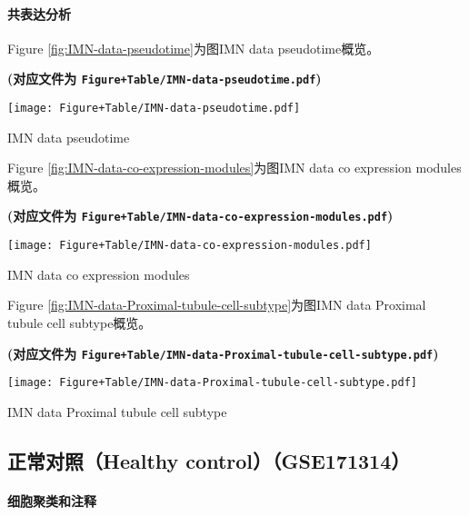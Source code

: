 \documentclass[
]{article}
\begin{document}
\hypertarget{ux5171ux8868ux8fbeux5206ux6790-2}{%
\paragraph{共表达分析}\label{ux5171ux8868ux8fbeux5206ux6790-2}}

Figure \ref{fig:IMN-data-pseudotime}为图IMN data pseudotime概览。

\textbf{(对应文件为 \texttt{Figure+Table/IMN-data-pseudotime.pdf})}

\def\@captype{figure}
\begin{center}
\texttt{[image: Figure+Table/IMN-data-pseudotime.pdf]}
\caption{IMN data pseudotime}\label{fig:IMN-data-pseudotime}
\end{center}

Figure \ref{fig:IMN-data-co-expression-modules}为图IMN data co expression modules概览。

\textbf{(对应文件为 \texttt{Figure+Table/IMN-data-co-expression-modules.pdf})}

\def\@captype{figure}
\begin{center}
\texttt{[image: Figure+Table/IMN-data-co-expression-modules.pdf]}
\caption{IMN data co expression modules}\label{fig:IMN-data-co-expression-modules}
\end{center}

Figure \ref{fig:IMN-data-Proximal-tubule-cell-subtype}为图IMN data Proximal tubule cell subtype概览。

\textbf{(对应文件为 \texttt{Figure+Table/IMN-data-Proximal-tubule-cell-subtype.pdf})}

\def\@captype{figure}
\begin{center}
\texttt{[image: Figure+Table/IMN-data-Proximal-tubule-cell-subtype.pdf]}
\caption{IMN data Proximal tubule cell subtype}\label{fig:IMN-data-Proximal-tubule-cell-subtype}
\end{center}

\hypertarget{ux6b63ux5e38ux5bf9ux7167healthy-controlgse171314}{%
\subsection{正常对照（Healthy control）（GSE171314）}\label{ux6b63ux5e38ux5bf9ux7167healthy-controlgse171314}}

\hypertarget{ux7ec6ux80deux805aux7c7bux548cux6ce8ux91ca-4}{%
\paragraph{细胞聚类和注释}\label{ux7ec6ux80deux805aux7c7bux548cux6ce8ux91ca-4}}
\end{document}

